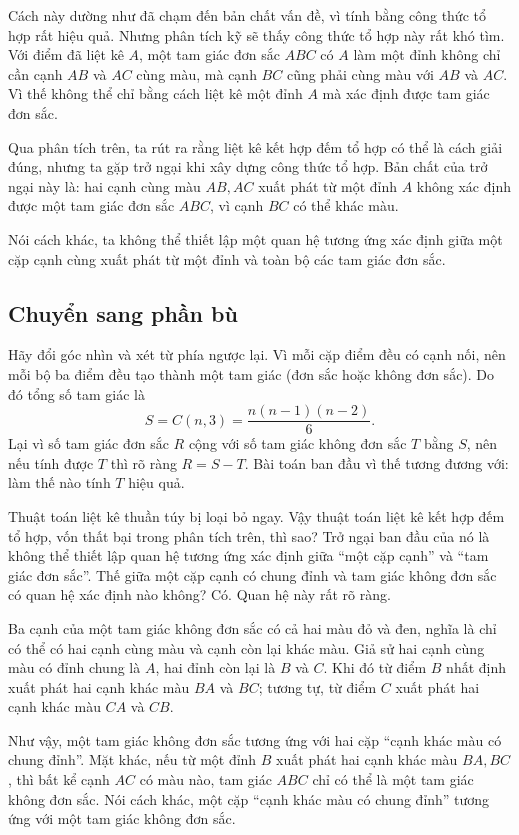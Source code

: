 \documentclass[11pt]{article}
\begin{document}
Cách này dường như đã chạm đến bản chất vấn đề, vì tính bằng công thức tổ
hợp rất hiệu quả. Nhưng phân tích kỹ sẽ thấy công thức tổ hợp này rất khó
tìm. Với điểm đã liệt kê \(A\), một tam giác đơn sắc \(ABC\) có \(A\) làm
một đỉnh không chỉ cần cạnh \(AB\) và \(AC\) cùng màu, mà cạnh \(BC\) cũng
phải cùng màu với \(AB\) và \(AC\). Vì thế không thể chỉ bằng cách liệt kê
một đỉnh \(A\) mà xác định được tam giác đơn sắc.

Qua phân tích trên, ta rút ra rằng liệt kê kết hợp đếm tổ hợp có thể là
cách giải đúng, nhưng ta gặp trở ngại khi xây dựng công thức tổ hợp. Bản
chất của trở ngại này là: hai cạnh cùng màu \(AB,AC\) xuất phát từ một
đỉnh \(A\) không xác định được một tam giác đơn sắc \(ABC\), vì cạnh
\(BC\) có thể khác màu.

Nói cách khác, ta không thể thiết lập một quan hệ tương ứng xác định giữa
một cặp cạnh cùng xuất phát từ một đỉnh và toàn bộ các tam giác đơn sắc.

\subsection{Chuyển sang phần bù}

Hãy đổi góc nhìn và xét từ phía ngược lại. Vì mỗi cặp điểm đều có cạnh
nối, nên mỗi bộ ba điểm đều tạo thành một tam giác (đơn sắc hoặc không
đơn sắc). Do đó tổng số tam giác là
\[
  S=C(n,3)=\frac{n(n-1)(n-2)}{6}.
\]
Lại vì số tam giác đơn sắc \(R\) cộng với số tam giác không đơn sắc \(T\)
bằng \(S\), nên nếu tính được \(T\) thì rõ ràng \(R=S-T\). Bài toán ban
đầu vì thế tương đương với: làm thế nào tính \(T\) hiệu quả.

Thuật toán liệt kê thuần túy bị loại bỏ ngay. Vậy thuật toán liệt kê kết
hợp đếm tổ hợp, vốn thất bại trong phân tích trên, thì sao? Trở ngại ban
đầu của nó là không thể thiết lập quan hệ tương ứng xác định giữa ``một
cặp cạnh'' và ``tam giác đơn sắc''. Thế giữa một cặp cạnh có chung đỉnh
và tam giác không đơn sắc có quan hệ xác định nào không? Có. Quan hệ này
rất rõ ràng.

Ba cạnh của một tam giác không đơn sắc có cả hai màu đỏ và đen, nghĩa là
chỉ có thể có hai cạnh cùng màu và cạnh còn lại khác màu. Giả sử hai cạnh
cùng màu có đỉnh chung là \(A\), hai đỉnh còn lại là \(B\) và \(C\). Khi
đó từ điểm \(B\) nhất định xuất phát hai cạnh khác màu \(BA\) và \(BC\);
tương tự, từ điểm \(C\) xuất phát hai cạnh khác màu \(CA\) và \(CB\).

Như vậy, một tam giác không đơn sắc tương ứng với hai cặp ``cạnh khác màu
có chung đỉnh''. Mặt khác, nếu từ một đỉnh \(B\) xuất phát hai cạnh khác
màu \(BA,BC\), thì bất kể cạnh \(AC\) có màu nào, tam giác \(ABC\) chỉ có
thể là một tam giác không đơn sắc. Nói cách khác, một cặp ``cạnh khác màu
có chung đỉnh'' tương ứng với một tam giác không đơn sắc.
\end{document}
